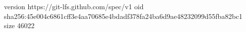 version https://git-lfs.github.com/spec/v1
oid sha256:45e004c6861cff3e4aa70685e4bdadf378fa24ba6d9ae48232099d55fba82bc1
size 46022
